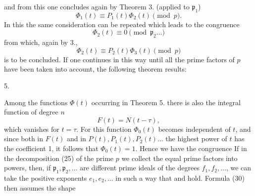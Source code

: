 and from this one concludes again by Theorem 3. (applied to $\mathfrak p_1$)
\[ \Phi_1(t) \equiv P_1(t) \Phi_2(t) \pmod p. \]
In this the same consideration can be repeated which leads to the congruence
\[ \Phi_2(t) \equiv 0 \pmod{\mathfrak p_2 \ldots} \]
from which, again by 3.,
\[ \Phi_2(t) \equiv P_2(t) \Phi_3(t) \pmod p \]
is to be concluded. If one continues in this way until all the prime factors of $p$ have been taken into account, the following theorem results:

5. 


Among the functions $\Phi(t)$ occurring in Theorem 5. there is also the integral function of degree $n$
\[ F(t) = N(t-\tau), \]
which vanishes for $t=\tau$. For this function $\Phi_0(t)$ becomes independent of $t$, and since both in $F(t)$ and in $P(t), P_1(t), P_2(t) \ldots$ the highest power of $t$ has the coefficient 1, it follows that $\Phi_0(t) = 1$. Hence we have the congruence
If in the decomposition (25) of the prime $p$ we collect the equal prime factors into powers, then, if $\mathfrak p_1, \mathfrak p_2, \ldots$ are different prime ideals of the degrees $f_1, f_2, \ldots$, we can take the positive exponents $e_1, e_2, \ldots$ in such a way that
and
hold. Formula (30) then assumes the shape
